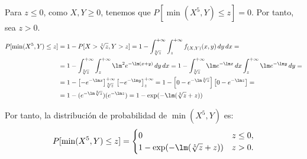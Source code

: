 \begin{ejercicio}
\begin{enumerate}
        Para $z\leq 0$, como $X,Y\geq 0$, tenemos que $P[\min(X^5,Y)\leq z]=0$. Por tanto, sea $z>0$.
        \begin{align*}
            P[\min(X^5,Y)\leq z]&=1-P[X>\sqrt[5]{z},Y>z]
            = 1-\int_{\sqrt[5]{z}}^{+\infty}\int_{z}^{+\infty} f_{(X,Y)}(x,y) \, dy \, dx
            =\\&= 1-\int_{\sqrt[5]{z}}^{+\infty}\int_{z}^{+\infty} \lm^2 e^{-\lm(x+y)} \, dy \, dx
            = 1-\int_{\sqrt[5]{z}}^{+\infty}\lm e^{-\lm x} \, dx\int_{z}^{+\infty} \lm e^{-\lm y} \, dy
            =\\&= 1-\left[-e^{-\lm x}\right]_{\sqrt[5]{z}}^{+\infty}\left[-e^{-\lm y}\right]_{z}^{+\infty}
            = 1-\left[0-e^{-\lm \sqrt[5]{z}}\right]\left[0-e^{-\lm z}\right]
            =\\&= 1-(e^{-\lm \sqrt[5]{z}})(e^{-\lm z})
            = 1-\exp(-\lm(\sqrt[5]{z}+z))
        \end{align*}

        Por tanto, la distribución de probabilidad de $\min(X^5,Y)$ es:
        \begin{equation*}
            P[\min(X^5,Y)\leq z] = \begin{cases}
                0 & z\leq 0, \\
                1-\exp(-\lm(\sqrt[5]{z}+z)) & z>0.
            \end{cases}
        \end{equation*}
    \end{enumerate}
\end{ejercicio}

